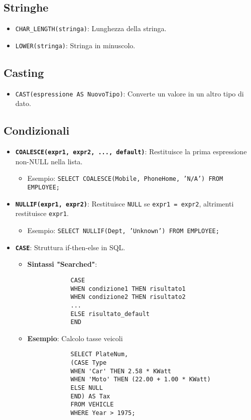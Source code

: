 \documentclass{article}
\begin{document}
	\subsection{Stringhe}
	\begin{itemize}
		\item \texttt{CHAR\_LENGTH(stringa)}: Lunghezza della stringa.
		\item \texttt{LOWER(stringa)}: Stringa in minuscolo.
	\end{itemize}
	
	\subsection{Casting}
	\begin{itemize}
		\item \texttt{CAST(espressione AS NuovoTipo)}: Converte un valore in un altro tipo di dato.
	\end{itemize}
	
	\subsection{Condizionali}
	\begin{itemize}
		\item \textbf{\texttt{COALESCE(expr1, expr2, ..., default)}}: Restituisce la prima espressione non-NULL nella lista.
		\begin{itemize}
			\item Esempio: \texttt{SELECT COALESCE(Mobile, PhoneHome, 'N/A') FROM EMPLOYEE;}
		\end{itemize}
		\item \textbf{\texttt{NULLIF(expr1, expr2)}}: Restituisce \texttt{NULL} se \texttt{expr1 = expr2}, altrimenti restituisce \texttt{expr1}.
		\begin{itemize}
			\item Esempio: \texttt{SELECT NULLIF(Dept, 'Unknown') FROM EMPLOYEE;}
		\end{itemize}
		\item \textbf{\texttt{CASE}}: Struttura if-then-else in SQL.
		\begin{itemize}
			\item \textbf{Sintassi "Searched"}:
			\begin{verbatim}
			CASE
			WHEN condizione1 THEN risultato1
			WHEN condizione2 THEN risultato2
			...
			ELSE risultato_default
			END
			\end{verbatim}
			\item \textbf{Esempio}: Calcolo tasse veicoli
			\begin{verbatim}
			SELECT PlateNum,
			(CASE Type
			WHEN 'Car' THEN 2.58 * KWatt
			WHEN 'Moto' THEN (22.00 + 1.00 * KWatt)
			ELSE NULL
			END) AS Tax
			FROM VEHICLE
			WHERE Year > 1975;
			\end{verbatim}
		\end{itemize}
	\end{itemize}
	
\end{document}

